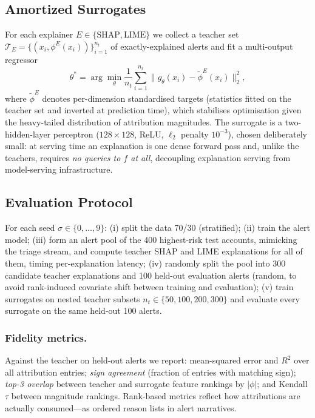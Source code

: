 \documentclass[runningheads]{llncs}
\begin{document}
\subsection{Amortized Surrogates}
For each explainer $E \in \{\mathrm{SHAP}, \mathrm{LIME}\}$ we collect a
teacher set
$\mathcal{T}_E = \{(x_i, \phi^{E}(x_i))\}_{i=1}^{n_t}$
of exactly-explained alerts and fit a multi-output regressor
\begin{equation}
\theta^\ast = \arg\min_\theta \frac{1}{n_t} \sum_{i=1}^{n_t}
\bigl\lVert g_\theta(x_i) - \tilde{\phi}^{E}(x_i) \bigr\rVert_2^2 ,
\label{eq:distill}
\end{equation}
where $\tilde{\phi}^{E}$ denotes per-dimension standardised targets
(statistics fitted on the teacher set and inverted at prediction time),
which stabilises optimisation given the heavy-tailed distribution of
attribution magnitudes. The surrogate is a two-hidden-layer perceptron
($128{\times}128$, ReLU, $\ell_2$ penalty $10^{-3}$), chosen deliberately
small: at serving time an explanation is one dense forward pass and, unlike
the teachers, requires \emph{no queries to $f$ at all}, decoupling
explanation serving from model-serving infrastructure.

\subsection{Evaluation Protocol}
\label{sec:protocol}
For each seed $\sigma \in \{0,\dots,9\}$: (i) split the data 70/30
(stratified); (ii) train the alert model; (iii) form an alert pool of the
400 highest-risk test accounts, mimicking the triage stream, and compute
teacher SHAP and LIME explanations for all of them, timing per-explanation
latency; (iv) randomly split the pool into 300 candidate teacher
explanations and 100 held-out evaluation alerts (random, to avoid
rank-induced covariate shift between training and evaluation); (v) train
surrogates on nested teacher subsets $n_t \in \{50, 100, 200, 300\}$ and
evaluate every surrogate on the same held-out 100 alerts.

\subsubsection{Fidelity metrics.}
Against the teacher on held-out alerts we report: mean-squared error and
$R^2$ over all attribution entries; \emph{sign agreement} (fraction of
entries with matching sign); \emph{top-3 overlap} between teacher and
surrogate feature rankings by $|\phi|$; and Kendall $\tau$ between
magnitude rankings. Rank-based metrics reflect how attributions are
actually consumed---as ordered reason lists in alert narratives.
\end{document}
